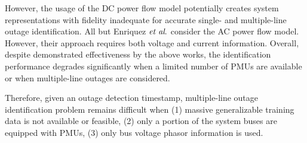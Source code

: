 However, the usage of the DC power flow model potentially creates system representations with fidelity inadequate for accurate single- and multiple-line outage identification. All but Enriquez $\textit{et al}.$ consider the AC power flow model. However, their approach requires both voltage and current information. Overall, despite demonstrated effectiveness by the above works, the identification performance degrades significantly when a limited number of PMUs are available or when multiple-line outages are considered. 


Therefore, given an outage detection timestamp, multiple-line outage identification problem remains difficult when (1) massive generalizable training data is not available or feasible, (2) only a portion of the system buses are equipped with PMUs, (3) only bus voltage phasor information is used.  
